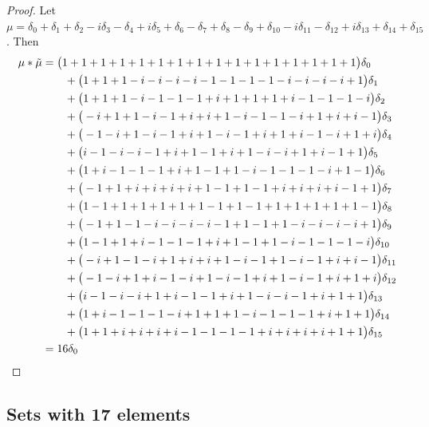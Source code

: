 \begin{proof}
Let  $\mu =  \delta_{0}+\delta_{1}+\delta_{2}-i\delta_{3}-\delta_{4}+i\delta_{5}+\delta_{6}-\delta_{7}+\delta_{8}-\delta_{9}+\delta_{10}-i\delta_{11}-\delta_{12}+i\delta_{13}+\delta_{14}+\delta_{15}
$.  Then 
\begin{align*} 
\mu * \tilde \mu & = \big(1+1+1+1+1+1+1+1+1+1+1+1+1+1+1+1\big)\delta_{0}
\\&\qquad
+\big(1+1+1-i-i-i-i-1-1-1-1-i-i-i-i+1\big)\delta_{1}
\\&\qquad
+\big(1+1+1-i-1-1-1+i+1+1+1+i-1-1-1-i\big)\delta_{2}
\\&\qquad
+\big(-i+1+1-i-1+i+i+1-i-1-1-i+1+i+i-1\big)\delta_{3}
\\&\qquad
+\big(-1-i+1-i-1+i+1-i-1+i+1+i-1-i+1+i\big)\delta_{4}
\\&\qquad
+\big(i-1-i-i-1+i+1-1+i+1-i-i+1+i-1+1\big)\delta_{5}
\\&\qquad
+\big(1+i-1-1-1+i+1-1+1-i-1-1-1-i+1-1\big)\delta_{6}
\\&\qquad
+\big(-1+1+i+i+i+i+1-1+1-1+i+i+i+i-1+1\big)\delta_{7}
\\&\qquad
+\big(1-1+1+1+1+1+1-1+1-1+1+1+1+1+1-1\big)\delta_{8}
\\&\qquad
+\big(-1+1-1-i-i-i-i-1+1-1+1-i-i-i-i+1\big)\delta_{9}
\\&\qquad
+\big(1-1+1+i-1-1-1+i+1-1+1-i-1-1-1-i\big)\delta_{10}
\\&\qquad
+\big(-i+1-1-i+1+i+i+1-i-1+1-i-1+i+i-1\big)\delta_{11}
\\&\qquad
+\big(-1-i+1+i-1-i+1-i-1+i+1-i-1+i+1+i\big)\delta_{12}
\\&\qquad
+\big(i-1-i-i+1+i-1-1+i+1-i-i-1+i+1+1\big)\delta_{13}
\\&\qquad
+\big(1+i-1-1-1-i+1+1+1-i-1-1-1+i+1+1\big)\delta_{14}
\\&\qquad
+\big(1+1+i+i+i+i-1-1-1-1+i+i+i+i+1+1\big)\delta_{15}\\&=16\delta_{0 }\qedhere
\end{align*}
\end{proof}





 
\subsection{Sets with 17 elements}

